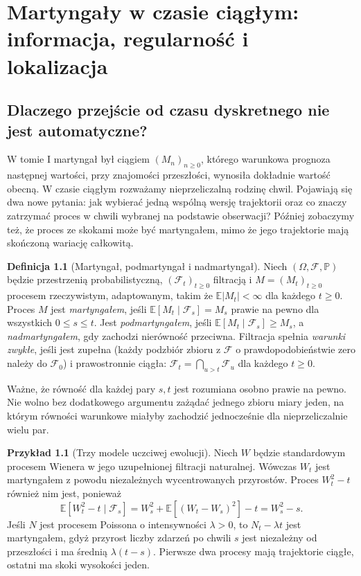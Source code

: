 \documentclass[11pt,a4paper,oneside]{report}
\numberwithin{equation}{chapter}
\theoremstyle{plain}
\theoremstyle{definition}
\newtheorem{definicja}{Definicja}[chapter]
\newtheorem{przyklad}{Przykład}[chapter]
\theoremstyle{remark}
\newcommand{\Prob}{\mathbb{P}}
\newcommand{\E}{\mathbb{E}}
\newcommand{\calF}{\mathcal{F}}
\begin{document}
\chapter{Martyngały w czasie ciągłym: informacja, regularność i lokalizacja}
\label{ch:mart-cont}

\section{Dlaczego przejście od czasu dyskretnego nie jest automatyczne?}
W tomie I martyngał był ciągiem $(M_n)_{n\ge0}$, którego
warunkowa prognoza następnej wartości, przy znajomości przeszłości,
wynosiła dokładnie wartość obecną. W czasie ciągłym rozważamy
nieprzeliczalną rodzinę chwil. Pojawiają się dwa nowe pytania:
jak wybierać jedną wspólną wersję trajektorii oraz co znaczy
zatrzymać proces w chwili wybranej na podstawie obserwacji?
Później zobaczymy też, że proces ze skokami może być martyngałem,
mimo że jego trajektorie mają skończoną wariację całkowitą.

\begin{definicja}[Martyngał, podmartyngał i nadmartyngał]
Niech $(\Omega,\calF,\Prob)$ będzie przestrzenią probabilistyczną,
$(\calF_t)_{t\ge0}$ filtracją i $M=(M_t)_{t\ge0}$ procesem
rzeczywistym, adaptowanym, takim że $\E|M_t|<\infty$
dla każdego $t\ge0$. Proces $M$ jest \emph{martyngałem}, jeśli
$\E[M_t\mid\calF_s]=M_s$ prawie na pewno dla wszystkich
$0\le s\le t$. Jest \emph{podmartyngałem}, jeśli
$\E[M_t\mid\calF_s]\ge M_s$, a \emph{nadmartyngałem},
gdy zachodzi nierówność przeciwna. Filtracja spełnia
\emph{warunki zwykłe}, jeśli jest zupełna (każdy podzbiór zbioru z $\calF$ o prawdopodobieństwie
zero należy do $\calF_0$) i prawostronnie ciągła:
$\calF_t=\bigcap_{u>t}\calF_u$ dla każdego $t\ge0$.
\end{definicja}

Ważne, że równość dla każdej pary $s,t$ jest rozumiana osobno
prawie na pewno. Nie wolno bez dodatkowego argumentu zażądać
jednego zbioru miary jeden, na którym równości warunkowe
miałyby zachodzić jednocześnie dla nieprzeliczalnie wielu par.

\begin{przyklad}[Trzy modele uczciwej ewolucji]
Niech $W$ będzie standardowym procesem Wienera w jego
uzupełnionej filtracji naturalnej. Wówczas
$W_t$ jest martyngałem z powodu niezależnych wycentrowanych
przyrostów. Proces $W_t^2-t$ również nim jest, ponieważ
\[
\E[W_t^2-t\mid\calF_s]
=W_s^2+\E[(W_t-W_s)^2]-t=W_s^2-s.
\]
Jeśli $N$ jest procesem Poissona o intensywności $\lambda>0$,
to $N_t-\lambda t$ jest martyngałem, gdyż przyrost liczby
zdarzeń po chwili $s$ jest niezależny od przeszłości i ma
średnią $\lambda(t-s)$. Pierwsze dwa procesy mają trajektorie
ciągłe, ostatni ma skoki wysokości jeden.
\end{przyklad}
\end{document}
